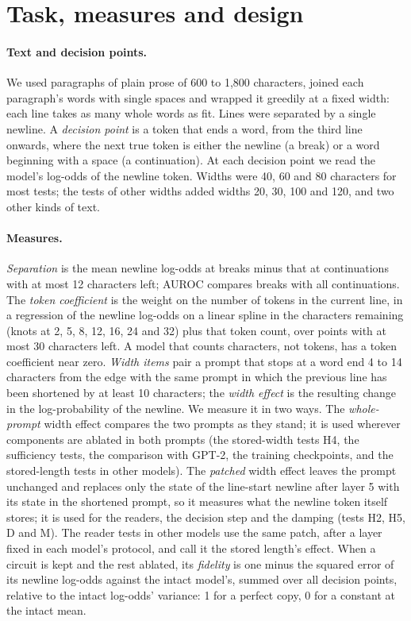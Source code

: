 \documentclass[11pt,a4paper]{article}
\begin{document}
\section{Task, measures and design}
\label{sec:design}

\paragraph{Text and decision points.}
We used paragraphs of plain prose of 600 to 1,800 characters, joined each paragraph's words with single spaces and wrapped it greedily at a fixed width: each line takes as many whole words as fit. Lines were separated by a single newline. A \emph{decision point} is a token that ends a word, from the third line onwards, where the next true token is either the newline (a break) or a word beginning with a space (a continuation). At each decision point we read the model's log-odds of the newline token. Widths were 40, 60 and 80 characters for most tests; the tests of other widths added widths 20, 30, 100 and 120, and two other kinds of text.

\paragraph{Measures.}
\emph{Separation} is the mean newline log-odds at breaks minus that at continuations with at most 12 characters left; AUROC compares breaks with all continuations. The \emph{token coefficient} is the weight on the number of tokens in the current line, in a regression of the newline log-odds on a linear spline in the characters remaining (knots at 2, 5, 8, 12, 16, 24 and 32) plus that token count, over points with at most 30 characters left. A model that counts characters, not tokens, has a token coefficient near zero. \emph{Width items} pair a prompt that stops at a word end 4 to 14 characters from the edge with the same prompt in which the previous line has been shortened by at least 10 characters; the \emph{width effect} is the resulting change in the log-probability of the newline. We measure it in two ways. The \emph{whole-prompt} width effect compares the two prompts as they stand; it is used wherever components are ablated in both prompts (the stored-width tests H4, the sufficiency tests, the comparison with GPT-2, the training checkpoints, and the stored-length tests in other models). The \emph{patched} width effect leaves the prompt unchanged and replaces only the state of the line-start newline after layer 5 with its state in the shortened prompt, so it measures what the newline token itself stores; it is used for the readers, the decision step and the damping (tests H2, H5, D and M). The reader tests in other models use the same patch, after a layer fixed in each model's protocol, and call it the stored length's effect. When a circuit is kept and the rest ablated, its \emph{fidelity} is one minus the squared error of its newline log-odds against the intact model's, summed over all decision points, relative to the intact log-odds' variance: 1 for a perfect copy, 0 for a constant at the intact mean.
\end{document}
